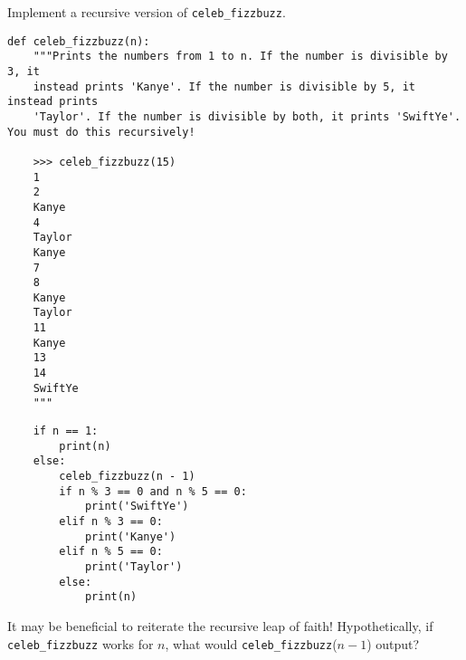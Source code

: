 \begin{blocksection}
\question Implement a recursive version of \lstinline$celeb_fizzbuzz$.

\begin{lstlisting}
def celeb_fizzbuzz(n):
    """Prints the numbers from 1 to n. If the number is divisible by 3, it
    instead prints 'Kanye'. If the number is divisible by 5, it instead prints
    'Taylor'. If the number is divisible by both, it prints 'SwiftYe'. You must do this recursively!

    >>> celeb_fizzbuzz(15)
    1
    2
    Kanye
    4
    Taylor
    Kanye
    7
    8
    Kanye
    Taylor
    11
    Kanye
    13
    14
    SwiftYe
    """
\end{lstlisting}

\begin{solution}[1.5in]
\begin{lstlisting}
    if n == 1:
        print(n)
    else:
        celeb_fizzbuzz(n - 1)
        if n % 3 == 0 and n % 5 == 0:
            print('SwiftYe')
        elif n % 3 == 0:
            print('Kanye')
        elif n % 5 == 0:
            print('Taylor')
        else:
            print(n)
\end{lstlisting}
\end{solution}
\end{blocksection}

\begin{questionmeta}
    It may be beneficial to reiterate the recursive leap of faith! Hypothetically, if \texttt{celeb\_fizzbuzz} works for $n$, what would \texttt{celeb\_fizzbuzz}($n - 1$) output?
\end{questionmeta}
